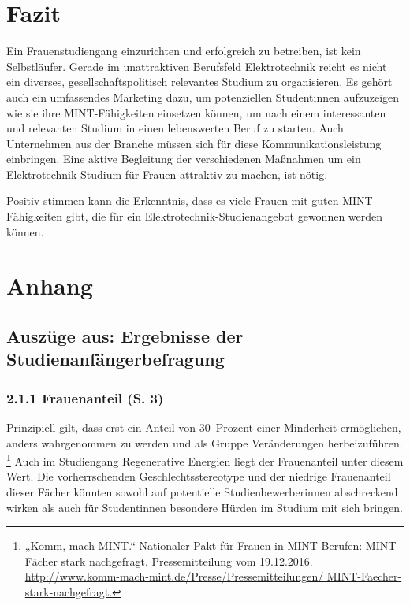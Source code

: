 \documentclass[a4paper, 12 pt]{IEEEtran}
\begin{document}
\section{Fazit}
\label{sec:Fazit}
Ein Frauenstudiengang einzurichten und erfolgreich zu betreiben, ist kein Selbstläufer. Gerade im unattraktiven Berufsfeld Elektrotechnik reicht es nicht ein diverses, gesellschaftspolitisch relevantes Studium zu organisieren. Es gehört auch ein umfassendes Marketing dazu, um potenziellen Studentinnen aufzuzeigen wie sie ihre MINT-Fähigkeiten einsetzen können, um nach einem interessanten und relevanten Studium in einen lebenswerten Beruf zu starten. Auch Unternehmen aus der Branche müssen sich für diese Kommunikationsleistung einbringen. Eine aktive Begleitung der verschiedenen Maßnahmen um ein Elektrotechnik-Studium für Frauen attraktiv zu machen, ist nötig. 

Positiv stimmen kann die Erkenntnis, dass es viele Frauen mit guten MINT-Fähigkeiten gibt, die für ein Elektrotechnik-Studienangebot gewonnen werden können.




\section{Anhang}

\subsection{Auszüge aus: Ergebnisse der Studienanfänger\-befra\-gung \cite{Rei.08.02.2019}}\label{sec:ReissAuszuege}

\subsubsection*{2.1.1 Frauenanteil (S. 3)}

Prinzipiell gilt, dass erst ein Anteil von $30$~Prozent einer Minderheit ermöglichen, anders wahrgenommen zu werden und als Gruppe Veränderungen herbeizuführen. 
\footnote{„Komm, mach MINT.“ Nationaler Pakt für Frauen in MINT-Berufen: MINT-Fächer stark nachgefragt. Pressemitteilung vom 19.12.2016. \url{http://www.komm-mach-mint.de/Presse/Pressemitteilungen/ MINT-Faecher-stark-nachgefragt.}}
Auch im Studiengang Regenerative Energien liegt der Frauenanteil unter diesem Wert. Die vorherrschenden Geschlechtsstereotype und der niedrige Frauenanteil dieser Fächer könnten sowohl auf potentielle
Studienbewerberinnen abschreckend wirken als auch für Studentinnen besondere Hürden im Studium mit sich bringen.
\end{document}
